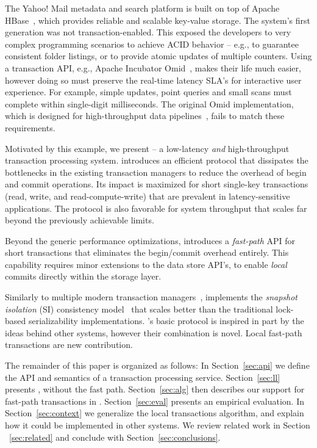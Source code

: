 The Yahoo! Mail metadata and search platform is built on top of Apache HBase~\cite{hbase}, 
which provides reliable and scalable key-value storage. The system's first generation was not 
transaction-enabled. This exposed the developers to very complex programming scenarios 
to achieve ACID behavior -- e.g., to guarantee consistent folder listings, or to provide 
atomic updates of multiple counters. Using a transaction API, e.g.,  
Apache Incubator Omid~\cite{omid}, makes their life much easier, however doing so 
must preserve the real-time latency SLA's for interactive user experience. For example, 
simple updates, point queries and small scans must complete within single-digit milliseconds. 
The original Omid implementation, which is designed for high-throughput data pipelines~\cite{Omid2017}, 
fails to match these requirements. %

Motivated by this example, we present {\sys\/} -- a low-latency {\em and\/} high-throughput 
transaction processing system. {\sys\/} introduces an efficient protocol that dissipates the 
bottlenecks in the existing transaction managers to reduce the overhead of begin and commit 
operations. Its impact is maximized for short single-key transactions (read, write, and read-compute-write) 
that are prevalent in latency-sensitive applications. The protocol is also favorable for system 
throughput that scales far beyond the previously achievable limits. 

Beyond the generic performance optimizations, {\sys\/} introduces a {\em fast-path\/} API for short 
transactions that eliminates the begin/commit overhead entirely. This capability requires minor 
extensions to the data store API's, to enable {\em local\/} commits directly within the storage layer. 

Similarly to multiple modern transaction managers~\cite{cockroach,Spanner2012,Percolator2010,Omid2017},
{\sys\/} implements the {\em snapshot isolation} (SI) consistency model~\cite{DBLP:conf/sigmod/BerensonBGMOO95}
that scales better than the traditional lock-based serializability implementations. {\sys}'s basic protocol is 
inspired in part by the ideas behind other systems, however their combination is novel. Local fast-path transactions 
are new contribution. 

The remainder of this paper is organized as follows:
In Section~\ref{sec:api} we define the  API and semantics of a transaction processing service. 
Section~\ref{sec:ll} presents \sys, without the fast path. 
Section~\ref{sec:alg} then describes our support for fast-path  transactions in \sys.  
Section~\ref{sec:eval} presents an empirical evaluation.
In Section~\ref{sec:context} we generalize the local transactions algorithm, and explain how it could be implemented in 
other systems. We review related work in Section ~\ref{sec:related} and conclude with Section~\ref{sec:conclusions}.
